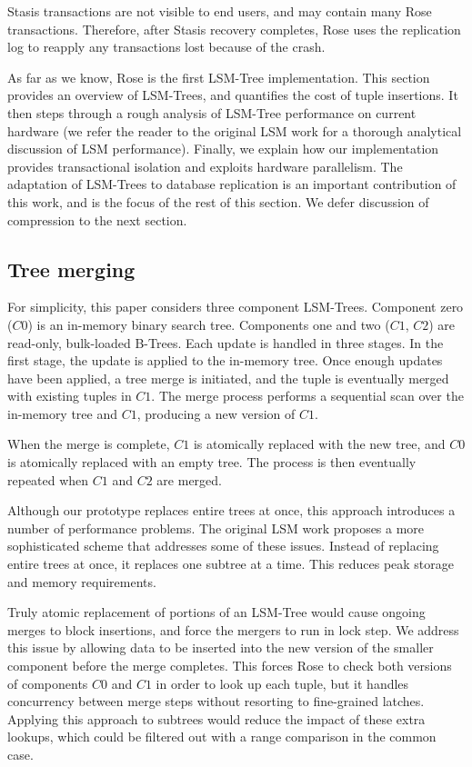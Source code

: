 \documentclass{vldb}
\newcommand{\rows}{Rose\xspace}
\begin{document}
Stasis transactions are not visible to end users, and may contain many
\rows transactions.  Therefore, after Stasis recovery completes, \rows
uses the replication log to reapply any transactions lost because of the
crash.

As far as we know, \rows is the first LSM-Tree implementation.  This
section provides an overview of LSM-Trees, and
quantifies the cost of tuple insertions.  It then steps through a rough
analysis of LSM-Tree performance on current hardware (we refer the
reader to the original LSM work for a thorough analytical discussion
of LSM performance).  Finally, we explain how our implementation
provides transactional isolation and exploits hardware parallelism.
The adaptation of LSM-Trees to database
replication is an important contribution of this work, and is the
focus of the rest of this section.  We defer discussion of compression
to the next section.

\subsection{Tree merging}


For simplicity,
this paper considers three component LSM-Trees.  Component zero ($C0$)
is an in-memory binary search tree.  Components one and two ($C1$,
$C2$) are read-only, bulk-loaded B-Trees.  
Each update is handled in three stages.  In the first stage, the
update is applied to the in-memory tree.  Once enough updates
have been applied, a tree merge is initiated, and the tuple is
eventually merged with existing tuples in $C1$.  The merge process
performs a sequential scan over the in-memory tree and $C1$, producing
a new version of $C1$.

When the merge is complete, $C1$ is atomically replaced
with the new tree, and $C0$ is atomically replaced with an empty tree.
The process is then eventually repeated when $C1$ and $C2$ are merged.

Although our prototype replaces entire trees at once, this approach
introduces a number of performance problems.  The original LSM work
proposes a more sophisticated scheme that addresses some of these
issues.  Instead of replacing entire trees at once, it replaces one
subtree at a time.  This reduces peak storage and memory requirements.

Truly atomic replacement of portions of an LSM-Tree would cause ongoing
merges to block insertions, and force the mergers to run in lock step.
We address this issue by allowing data to be inserted into
the new version of the smaller component before the merge completes.
This forces \rows to check both versions of components $C0$ and $C1$
in order to look up each tuple, but it handles concurrency between merge steps
without resorting to fine-grained latches.  Applying this
approach to subtrees would reduce the impact of these extra lookups,
which could be filtered out with a range comparison in the common
case.
\end{document}
